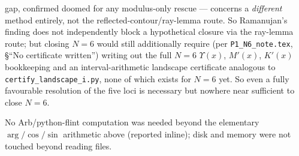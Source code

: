 \documentclass[11pt]{article}
\begin{document}
\begin{itemize}
gap, confirmed doomed for any modulus-only rescue --- concerns a \emph{different} method
entirely, not the reflected-contour/ray-lemma route. So Ramanujan's finding does not
independently block a hypothetical closure via the ray-lemma route; but closing $N=6$ would
still additionally require (per \texttt{P1\_N6\_note.tex}, \S``No certificate written'') writing
out the full $N=6$ $\Upsilon(x)$, $M'(x)$, $K'(x)$ bookkeeping and an interval-arithmetic
landscape certificate analogous to \texttt{certify\_landscape\_i.py}, none of which exists for
$N=6$ yet. So even a fully favourable resolution of the five loci is necessary but nowhere near
sufficient to close $N=6$.
\end{itemize}

No Arb/python-flint computation was needed beyond the elementary $\arg/\cos/\sin$ arithmetic
above (reported inline); disk and memory were not touched beyond reading files.
\end{document}
